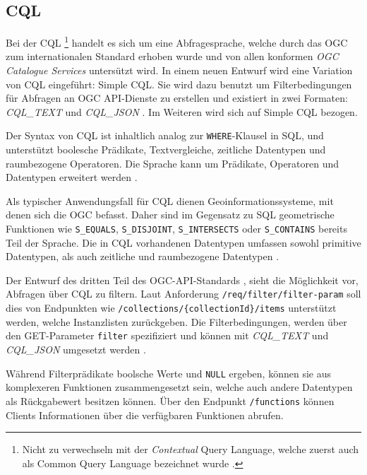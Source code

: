 \subsection{\acl{CQL}}

Bei der \acf{CQL} \footnote{Nicht zu verwechseln mit der \textit{Contextual} Query Language, welche zuerst auch als Common Query Language bezeichnet wurde \parencite{thelibraryofcongressCQLContextual2023, ZINGGentle2003}.} handelt es sich um eine Abfragesprache, welche durch das \ac{OGC} zum internationalen Standard erhoben wurde und von allen konformen \textit{\ac{OGC} Catalogue Services} untersützt wird.  In einem neuen Entwurf  wird eine Variation von \ac{CQL} eingeführt: Simple \ac{CQL}. Sie wird dazu benutzt um Filterbedingungen für Abfragen an \ac{OGC} API-Dienste zu erstellen und existiert in zwei Formaten: \textit{CQL\_TEXT} und \textit{CQL\_JSON} . Im Weiteren wird sich auf Simple \ac{CQL} bezogen.

Der Syntax von \ac{CQL} ist inhaltlich analog zur \texttt{WHERE}-Klausel in \acs{SQL}, und unterstützt boolesche Prädikate, Textvergleiche, zeitliche Datentypen und raumbezogene Operatoren. Die Sprache kann um Prädikate, Operatoren und Datentypen erweitert werden .

Als typischer Anwendungsfall für \ac{CQL} dienen Geoinformationssysteme, mit denen sich die \ac{OGC} befasst. Daher sind im Gegensatz zu \ac{SQL} geometrische Funktionen wie \texttt{S\_EQUALS}, \texttt{S\_DISJOINT}, \texttt{S\_INTERSECTS} oder \texttt{S\_CONTAINS} bereits Teil der Sprache. Die in \ac{CQL} vorhandenen Datentypen umfassen sowohl primitive Datentypen, als auch zeitliche und raumbezogene Datentypen .

Der Entwurf des dritten Teil des OGC-API-Standards , sieht die Möglichkeit vor, Abfragen über \ac{CQL} zu filtern. Laut Anforderung \texttt{/req/filter/filter-param} soll dies von Endpunkten wie \texttt{/collections/\{collectionId\}/items} unterstützt werden, welche Instanzlisten zurückgeben. Die Filterbedingungen, werden über den GET-Parameter \texttt{filter} spezifiziert und können mit \textit{CQL\_TEXT} und \textit{CQL\_JSON} umgesetzt werden .

Während Filterprädikate boolsche Werte und \texttt{NULL} ergeben, können sie aus komplexeren Funktionen zusammengesetzt sein, welche auch andere Datentypen als Rückgabewert besitzen können. Über den Endpunkt \texttt{/functions} können Clients Informationen über die verfügbaren Funktionen abrufen.
